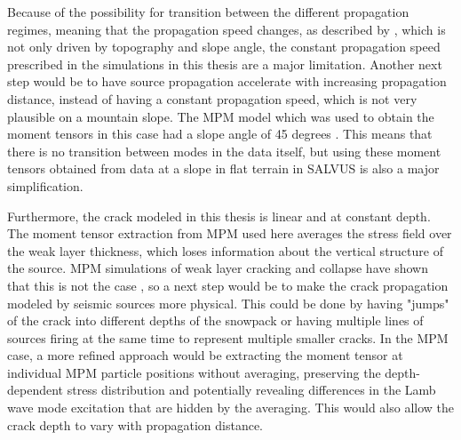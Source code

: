 Because of the possibility for transition between the different propagation regimes, meaning that the propagation speed changes, as described by \cite{trottetTransitionSubRayleighAnticrack2022}, which is not only driven by topography and slope angle, the constant propagation speed prescribed in the simulations in this thesis are a major limitation. Another next step would be to have source propagation accelerate with increasing propagation distance, instead of having a constant propagation speed, which is not very plausible on a mountain slope. The MPM model which was used to obtain the moment tensors in this case had a slope angle of 45 degrees \parencite{trottetTransitionSubRayleighAnticrack2022}. This means that there is no transition between modes in the data itself, but using these moment tensors obtained from data at a slope in flat terrain in SALVUS is also a major simplification. \par 

Furthermore, the crack modeled in this thesis is linear and at constant depth. The moment tensor extraction from MPM used here averages the stress field over the weak layer thickness, which loses information about the vertical structure of the source. MPM simulations of weak layer cracking and collapse have shown that this is not the case \parencite{trottetTransitionSubRayleighAnticrack2022}, so a next step would be to make the crack propagation modeled by seismic sources more physical. This could be done by having "jumps" of the crack into different depths of the snowpack or having multiple lines of sources firing at the same time to represent multiple smaller cracks. In the MPM case, a more refined approach would be extracting the moment tensor at individual MPM particle positions without averaging, preserving the depth-dependent stress distribution and potentially revealing differences in the Lamb wave mode excitation that are hidden by the averaging. This would also allow the crack depth to vary with propagation distance. \par

